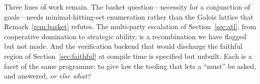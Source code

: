 Three lines of work remain. The basket question---necessity for a conjunction of
goals---needs minimal-hitting-set enumeration  rather than the Galois
lattice that Remark~\ref{rem:basket} refutes. The multi-party escalation of
Section~\ref{sec:atl}, from cooperative domination to strategic ability, is a recombination
we have flagged but not made. And the verification backend that would discharge the
faithful region of Section~\ref{sec:faithful} at compile time is specified but unbuilt.
Each is a facet of the same programme: to give law the tooling that lets a ``must'' be
asked, and answered, \emph{or else what?}
